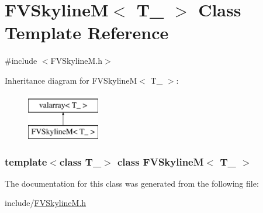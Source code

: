 \hypertarget{classFVSkylineM}{
\section{FVSkylineM$<$ T\_\- $>$ Class Template Reference}
\label{d7/d1e/classFVSkylineM}
}


{\ttfamily \#include $<$FVSkylineM.h$>$}

Inheritance diagram for FVSkylineM$<$ T\_\- $>$:\begin{figure}[H]
\begin{center}
\leavevmode
\includegraphics[height=2.000000cm]{d7/d1e/classFVSkylineM}
\end{center}
\end{figure}
\subsubsection*{template$<$class T\_\-$>$ class FVSkylineM$<$ T\_\- $>$}



The documentation for this class was generated from the following file:\begin{DoxyCompactItemize}
\item 
include/\hyperlink{FVSkylineM_8h}{FVSkylineM.h}\end{DoxyCompactItemize}
